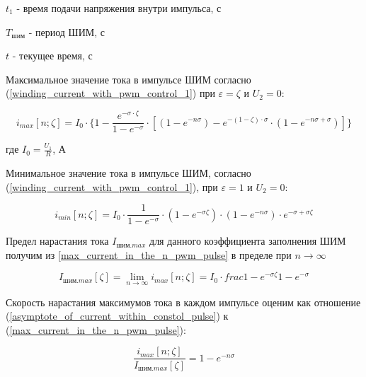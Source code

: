 $t_{1}$ - время подачи напряжения внутри импульса, с

$T_\text{шим}$ - период ШИМ, с

$t$ - текущее время, с
\newline

Максимальное значение тока в импульсе ШИМ согласно (\ref{winding_current_with_pwm_control_1}) при
$\varepsilon = \zeta$ и $U_{2} = 0$:

\begin{equation}
    \label{max_current_in_the_n_pwm_pulse}
    i_{max}[n; \zeta] =
        I_{0}
            \cdot \{ 1
                     - \frac{ e^{-\sigma \cdot \zeta} }{ 1 - e^{-\sigma} }
                       \cdot [ (1 - e^{-n\sigma})
                               - e^{ -(1 - \zeta) \cdot \sigma }
                                    \cdot ( 1 - e^{-n\sigma + \sigma} )
                             ]
                  \}
\end{equation}

где $I_{0} = \frac{ U_{1} }{ R }$, А

Минимальное значение тока в импульсе ШИМ, согласно (\ref{winding_current_with_pwm_control_1}), при
$\varepsilon = 1$ и $U_{2} = 0$:

\begin{equation}
    \label{min_current_in_the_n_pwm_pulse}
    i_{min}[n; \zeta] =
        I_{0}
            \cdot \frac{ 1 }{ 1-e^{-\sigma} }
            \cdot (1 - e^{-\sigma\zeta})
            \cdot (1 - e^{-n\sigma})
            \cdot e^{-\sigma + \sigma\zeta}
\end{equation}

Предел нарастания тока $I_{\text{шим}.max}$ для данного коэффициента заполнения ШИМ получим из
\ref{max_current_in_the_n_pwm_pulse} в пределе при $n \to \infty$

\begin{equation}
    \label{asymptote_of_current_within_constol_pulse}
    I_{\text{шим}.max}[\zeta]=
        \lim_{n \to \infty} i_{max} [n; \zeta] =
            I_{0} \cdot frac{ 1 - e^{-\sigma\zeta} }{ 1 - e^{-\sigma}}
\end{equation}

Скорость нарастания максимумов тока в каждом импульсе оценим как отношение
(\ref{asymptote_of_current_within_constol_pulse}) к (\ref{max_current_in_the_n_pwm_pulse}):

\begin{equation}
    \label{ current_grow_estimate }
    \frac{ i_{max}[n; \zeta] }{ I_{\text{шим}.max}[\zeta] } = 1 - e^{-n \sigma}
\end{equation}

